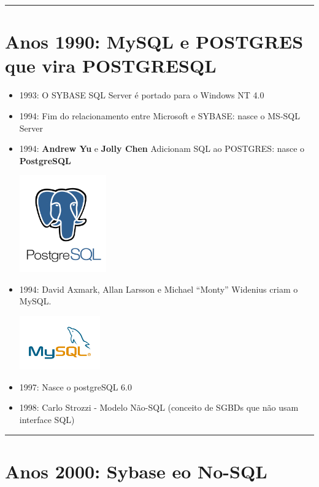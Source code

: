 \documentclass[
]{book}
\begin{document}
\begin{center}\rule{0.5\linewidth}{0.5pt}\end{center}

\section{Anos 1990: MySQL e POSTGRES que vira POSTGRESQL}\label{anos-1990-mysql-e-postgres-que-vira-postgresql}

\begin{itemize}
\item
  1993: O SYBASE SQL Server é portado para o Windows NT 4.0
\item
  1994: Fim do relacionamento entre Microsoft e SYBASE: nasce o MS-SQL Server
\item
  1994: \textbf{Andrew Yu} e \textbf{Jolly Chen} Adicionam SQL ao POSTGRES: nasce o \textbf{PostgreSQL}

  \includegraphics[width=1.46875in,height=\textheight]{images/2025-08-11/10-postgresql.png}
\item
  1994: David Axmark, Allan Larsson e Michael ``Monty'' Widenius criam o MySQL.

  \includegraphics[width=1.36458in,height=\textheight]{images/2025-08-11/09-mysql.png}
\item
  1997: Nasce o postgreSQL 6.0
\item
  1998: Carlo Strozzi - Modelo Não-SQL (conceito de SGBDs que não usam interface SQL)
\end{itemize}

\begin{center}\rule{0.5\linewidth}{0.5pt}\end{center}

\section{Anos 2000: Sybase eo No-SQL}\label{anos-2000-sybase-eo-no-sql}
\end{document}
